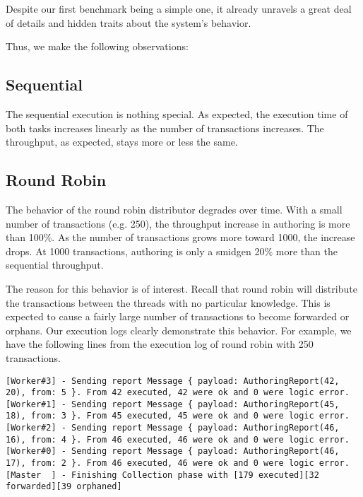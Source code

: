 
Despite our first benchmark being a simple one, it already unravels a great deal of details and
hidden traits about the system's behavior.

Thus, we make the following observations: 

\subsection*{Sequential}
The sequential execution is nothing special. As expected, the execution time of both tasks
increases linearly as the number of transactions increases. The throughput, as expected, stays
more or less the same.
	
	
\subsection*{Round Robin}
The behavior of the round robin distributor degrades over time. With a small number of
	transactions (e.g. 250), the throughput increase in authoring is more than 100\%. As the number
	of transactions grows more toward 1000, the increase drops. At 1000 transactions, authoring is
	only a smidgen 20\% more than the sequential throughput.

	The reason for this behavior is of interest. Recall that round robin will distribute the
	transactions between the threads with no particular knowledge. This is expected to cause a
	fairly large number of transactions to become forwarded or orphans. Our execution logs clearly
	demonstrate this behavior. For example, we have the following lines from the execution log of
	round robin with 250 transactions.

	\begin{lstlisting}
[Worker#3] - Sending report Message { payload: AuthoringReport(42, 20), from: 5 }. From 42 executed, 42 were ok and 0 were logic error.
[Worker#1] - Sending report Message { payload: AuthoringReport(45, 18), from: 3 }. From 45 executed, 45 were ok and 0 were logic error.
[Worker#2] - Sending report Message { payload: AuthoringReport(46, 16), from: 4 }. From 46 executed, 46 were ok and 0 were logic error.
[Worker#0] - Sending report Message { payload: AuthoringReport(46, 17), from: 2 }. From 46 executed, 46 were ok and 0 were logic error.
[Master  ] - Finishing Collection phase with [179 executed][32 forwarded][39 orphaned]
	\end{lstlisting}

